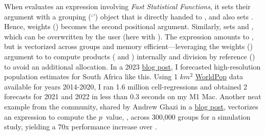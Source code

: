 \documentclass[nojss]{jss} %
\newcommand{\class}[1]{`\code{#1}'}
\newcommand{\fct}[1]{\code{#1()}}
\begin{document}
When \fct{fsummarise} evaluates an expression involving \emph{Fast Statistical Functions}, it sets their  argument with a grouping (\class{GRP}) object that is directly handed to , and also sets . Hence, weights () becomes the second positional argument. Similarly, \fct{fmutate} sets  and , which can be overwritten by the user (here with ). The expression  amounts to , but is vectorized across groups and memory efficient---leveraging the weights () argument to \fct{fsum} to compute products ( and ) internally and division by reference (\code{\%/=\%}) to avoid an additional allocation. In a 2023 \href{https://sebkrantz.github.io/Rblog/2023/04/12/collapse-and-the-fastverse-reflecting-the-past-present-and-future/}{blog post}, I forecasted high-resolution population estimates for South Africa like this. Using 1 $km^2$ \href{https://www.worldpop.org/}{WorldPop} data available for years 2014-2020, I ran 1.6 million cell-regressions and obtained 2 forecasts for 2021 and 2022 in less than 0.3 seconds on my M1 Mac. Another neat example from the community, shared by Andrew Ghazi in a \href{https://andrewghazi.github.io/posts/collapse\_is\_sick/sick.html}{blog post}, vectorizes an expression to compute the $p$~value, , across 300,000 groups for a simulation study, yielding a 70x performance increase over . \newline
\end{document}
